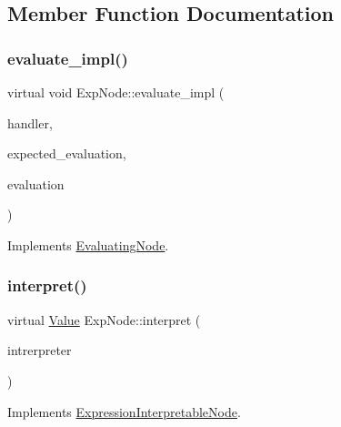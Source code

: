 \subsection{Member Function Documentation}
\mbox{\label{classExpNode_a58c05ac75051f109512ce8fa5ceb68c7}} 
\subsubsection{\texorpdfstring{evaluate\+\_\+impl()}{evaluate\_impl()}}
{\footnotesize\ttfamily virtual void Exp\+Node\+::evaluate\+\_\+impl (\begin{DoxyParamCaption}\item[{\hyperlink{classSystemHandler}{System\+Handler} $\ast$}]{handler,  }\item[{\hyperlink{statics_8h_a6664c451ca7787483a7981cc1de68dbb}{E\+V\+A\+L\+U\+A\+T\+I\+O\+N\+\_\+\+T\+Y\+PE}}]{expected\+\_\+evaluation,  }\item[{struct \hyperlink{structEvaluation}{Evaluation} $\ast$}]{evaluation }\end{DoxyParamCaption})\hspace{0.3cm}{\ttfamily [virtual]}}



Implements \hyperlink{classEvaluatingNode_a085fa06e0b46a93c814dc55cda0c1b26}{Evaluating\+Node}.

\mbox{\label{classExpNode_aedff3b19b9e36a77e4558a168b81debf}} 
\subsubsection{\texorpdfstring{interpret()}{interpret()}}
{\footnotesize\ttfamily virtual \hyperlink{classValue}{Value} Exp\+Node\+::interpret (\begin{DoxyParamCaption}\item[{\hyperlink{classInterpreter}{Interpreter} $\ast$}]{intrerpreter }\end{DoxyParamCaption})\hspace{0.3cm}{\ttfamily [virtual]}}



Implements \hyperlink{classExpressionInterpretableNode_a43650f046c48fc539f77a207e3c9181e}{Expression\+Interpretable\+Node}.

